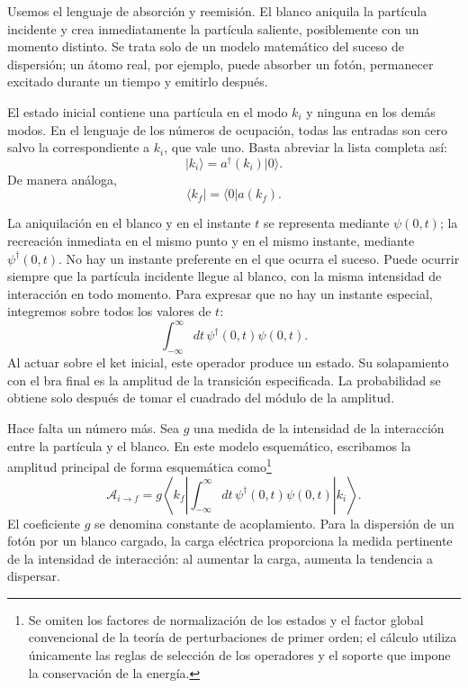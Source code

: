 Usemos el lenguaje de absorción y reemisión. El blanco aniquila la partícula incidente y crea inmediatamente la partícula saliente, posiblemente con un momento distinto. Se trata solo de un modelo matemático del suceso de dispersión; un átomo real, por ejemplo, puede absorber un fotón, permanecer excitado durante un tiempo y emitirlo después.

\begin{classroomqa}\end{classroomqa}

El estado inicial contiene una partícula en el modo \(k_i\) y ninguna en los demás modos. En el lenguaje de los números de ocupación, todas las entradas son cero salvo la correspondiente a \(k_i\), que vale uno. Basta abreviar la lista completa así:
\begin{equation}
\lvert k_i\rangle=a^\dagger(k_i)\lvert0\rangle.
\end{equation}
De manera análoga,
\begin{equation}
\langle k_f\rvert=\langle0\rvert a(k_f).
\end{equation}

La aniquilación en el blanco y en el instante \(t\) se representa mediante \(\psi(0,t)\); la recreación inmediata en el mismo punto y en el mismo instante, mediante \(\psi^\dagger(0,t)\). No hay un instante preferente en el que ocurra el suceso. Puede ocurrir siempre que la partícula incidente llegue al blanco, con la misma intensidad de interacción en todo momento. Para expresar que no hay un instante especial, integremos sobre todos los valores de \(t\):
\begin{equation}
\int_{-\infty}^{\infty}dt\,\psi^\dagger(0,t)\psi(0,t).
\end{equation}
Al actuar sobre el ket inicial, este operador produce un estado. Su solapamiento con el bra final es la amplitud de la transición especificada. La probabilidad se obtiene solo después de tomar el cuadrado del módulo de la amplitud.

Hace falta un número más. Sea \(g\) una medida de la intensidad de la interacción entre la partícula y el blanco. En este modelo esquemático, escribamos la amplitud principal de forma esquemática como\footnote{Se omiten los factores de normalización de los estados y el factor global convencional de la teoría de perturbaciones de primer orden; el cálculo utiliza únicamente las reglas de selección de los operadores y el soporte que impone la conservación de la energía.}
\begin{equation}
\mathcal A_{i\to f}
=g\left\langle k_f\left|
\int_{-\infty}^{\infty}dt\,
\psi^\dagger(0,t)\psi(0,t)
\right|k_i\right\rangle.
\end{equation}
El coeficiente \(g\) se denomina constante de acoplamiento. Para la dispersión de un fotón por un blanco cargado, la carga eléctrica proporciona la medida pertinente de la intensidad de interacción: al aumentar la carga, aumenta la tendencia a dispersar.

